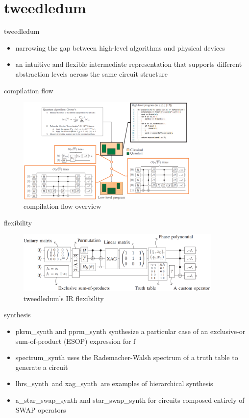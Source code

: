 \section{tweedledum}
\begin{frame}{tweedledum }  
  \begin{itemize}
    \item  narrowing the gap between high-level algorithms and physical devices
    \item  an intuitive and flexible intermediate representation that supports different abstraction levels across the  same  circuit  structure
  \end{itemize}
\end{frame}
\begin{frame}{compilation flow}
  \begin{figure}[htbq]
    \centering
    \includegraphics[width=0.8\textwidth]{figure/work_flow.png}
    \caption{compilation flow overview} 
    \label{fig-compilation}
  \end{figure}
\end{frame}
\begin{frame}{flexibility}
  \begin{figure}[htbq]
    \centering
    \includegraphics[width=0.9\textwidth]{figure/flex.png}
    \caption{tweedledum's IR flexibility} 
    \label{fig-flex}
  \end{figure}
\end{frame}
\begin{frame}{synthesis}
  \begin{itemize}
    \item pkrm\_synth and pprm\_synth synthesize a particular case of an exclusive-or sum-of-product (ESOP) expression for f
    \item spectrum\_synth uses the Rademacher-Walsh spectrum of a truth table to generate a circuit
    \item lhrs\_synth\ and xag\_synth\ are examples of hierarchical synthesis
    \item a\_star\_swap\_synth and star\_swap\_synth for circuits composed entirely of SWAP operators
  \end{itemize}  
\end{frame}
